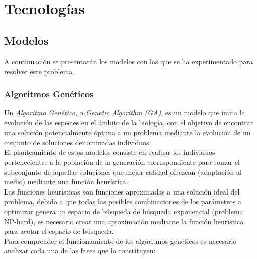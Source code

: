
\chapter{Tecnologías}
\label{tecnologias}

    \section{Modelos}

        A continuación se presentarán los modelos con los que se ha experimentado para resolver este problema. 

        \subsection {Algoritmos Genéticos}
            Un \textit{Algoritmo Genético}, o \textit{Genetic Algorithm (GA)}, es un modelo que imita la evolución de las especies en el ámbito de la biología, con el objetivo de encontrar una solución potencialmente óptima a un problema mediante la evolución de un conjunto de soluciones denominadas individuos.\\

            El planteamiento de estos modelos consiste en evaluar los individuos pertenecientes a la población de la generación correspondiente para tomar el subconjunto de aquellas soluciones que mejor calidad ofrezcan (adaptación al medio) mediante una función heurística.\\

            Las funciones heurísticas son funciones aproximadas a una solución ideal del problema, debido a que todas las posibles combinaciones de los parámetros a optimizar genera un espacio de búsqueda de búsqueda exponencial (problema NP-hard), es necesario crear una aproximación mediante la función heurística para acotar el espacio de búsqueda.\\

            Para comprender el funcionamiento de los algoritmos genéticos es necesario analizar cada una de las fases que lo constituyen:
            
